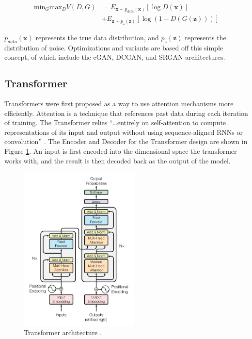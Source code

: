 \documentclass[letterpaper]{article} %
\begin{document}
\begin{equation}
\label{eq:gan_basic}
\begin{split}
\text{min}_G\text{max}_DV(D,G) &=
E_{\mathbf{x}\sim p_{data}(\mathbf{x})}[\log D(\mathbf{x})] \\
&+ E_{\mathbf{z}\sim p_{z}(\mathbf{z})}[\log(1 - D(G(\mathbf{z})))]
\end{split}
\end{equation}

$p_{data}(\mathbf{x})$ represents the true data distribution,
and $p_{z}(\mathbf{z})$ represents the distribution of noise.
Optimizations and variants are based off this simple concept, of which include
the cGAN, DCGAN, and SRGAN architectures.

\subsection{Transformer}
Transformers were first proposed
as a way to use attention mechanisms more efficiently.
Attention is a technique that references past data during each iteration of training.
The Transformer relies
``\dots entirely on self-attention to compute representations of its input and output
without using sequence-aligned RNNs or convolution''
\cite{attention_need}.
The Encoder and Decoder for the Transformer design
are shown in Figure \ref{fig:attention}.
An input is first encoded into the dimensional space
the transformer works with,
and the result is then decoded back as the output of the model.

\begin{figure}[htbp]
\centerline{\includegraphics[width=6cm]{attention_architecture.png}}
\caption{Transformer architecture
\cite{attention_need}.}
\label{fig:attention}
\end{figure}
\end{document}
